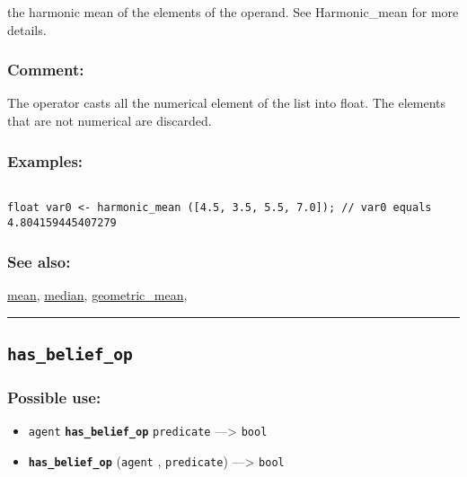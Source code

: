\documentclass[]{book}
\providecommand{\tightlist}{%
  \setlength{\itemsep}{0pt}\setlength{\parskip}{0pt}}
\theoremstyle{definition}
\theoremstyle{definition}
\theoremstyle{definition}
\theoremstyle{remark}
\begin{document}
the harmonic mean of the elements of the operand. See Harmonic\_mean for
more details.

\subsubsection{Comment:}\label{comment-47}

The operator casts all the numerical element of the list into float. The
elements that are not numerical are discarded.

\subsubsection{Examples:}\label{examples-185}

\begin{verbatim}
 
float var0 <- harmonic_mean ([4.5, 3.5, 5.5, 7.0]); // var0 equals 4.804159445407279
\end{verbatim}

\subsubsection{See also:}\label{see-also-110}

\href{operators-i-to-m.html\#mean}{mean},
\href{operators-i-to-m.html\#median}{median},
\href{operators-d-to-h.html\#geometric_mean}{geometric\_mean},

\begin{center}\rule{0.5\linewidth}{\linethickness}\end{center}

\subsection{\texorpdfstring{\texttt{has\_belief\_op}}{has\_belief\_op}}\label{has_belief_op}

\subsubsection{Possible use:}\label{possible-use-246}

\begin{itemize}
\tightlist
\item
  \texttt{agent} \textbf{\texttt{has\_belief\_op}} \texttt{predicate}
  ---\textgreater{} \texttt{bool}
\item
  \textbf{\texttt{has\_belief\_op}} (\texttt{agent} ,
  \texttt{predicate}) ---\textgreater{} \texttt{bool}
\end{itemize}
\end{document}
